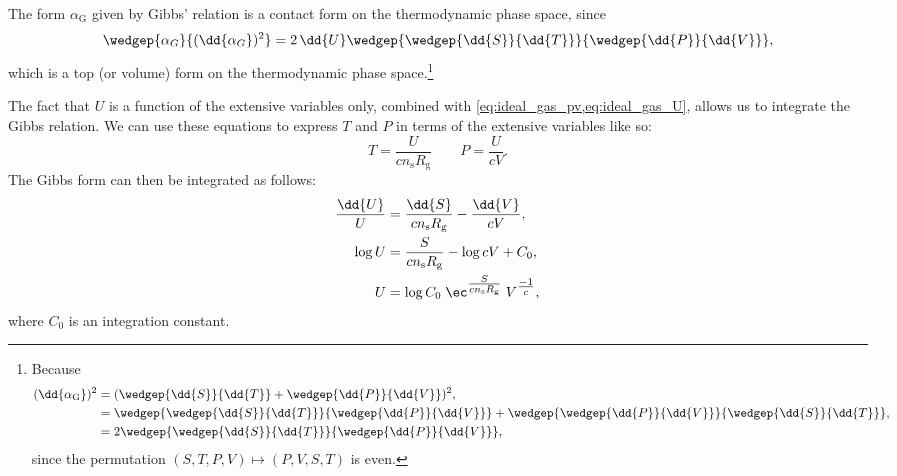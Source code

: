 The form $\alpha_\text{G}$ given by Gibbs' relation is a contact form on the thermodynamic phase space, since
$$ \wedgep{\alpha_G}{(\dd{\alpha_G})^2} = 2\,\dd{U}\wedgep{\wedgep{\dd{S}}{\dd{T}}}{\wedgep{\dd{P}}{\dd{V}}}, $$
which is a top (or volume) form on the thermodynamic phase space.\footnote
{
    Because 
    \begin{equation*} 
        \begin{split}
            (\dd{\alpha_\text{G}})^2 &= (\wedgep{\dd{S}}{\dd{T}} + \wedgep{\dd{P}}{\dd{V}})^2, \\
                            &= \wedgep{\wedgep{\dd{S}}{\dd{T}}}{\wedgep{\dd{P}}{\dd{V}}} + \wedgep{\wedgep{\dd{P}}{\dd{V}}}{\wedgep{\dd{S}}{\dd{T}}}, \\
                            &= 2\wedgep{\wedgep{\dd{S}}{\dd{T}}}{\wedgep{\dd{P}}{\dd{V}}}, \\
        \end{split}
    \end{equation*}
    since the permutation $ (S, T, P, V) \mapsto (P, V, S, T) $ is even.
}


The fact that $U$ is a function of the extensive variables only, combined with \cref{eq:ideal_gas_pv,eq:ideal_gas_U}, allows us to integrate the Gibbs relation. We can use these equations to express $T$ and $P$ in terms of the extensive variables like so:
$$ T = \frac{U}{cn_\text{s}R_\text{g}} \qquad P = \frac{U}{cV}. $$
The Gibbs form can then be integrated as follows:
\begin{equation*}
    \begin{split}
        \frac{\dd{U}}{U} &= \frac{\dd{S}}{cn_\text{s}R_\text{g}} - \frac{\dd{V}}{c V},\\
        \log{U}  &= \frac{S}{ cn_\text{s}R_\text{g}} - \log{c V} + C_0, \\
        U  &= \log{C_0} \; \ec^{\tfrac{S}{ cn_\text{s}R_\text{g}}} \; V^{\tfrac{-1}{c}},\\
    \end{split}
\end{equation*}
where $C_0$ is an integration constant.

